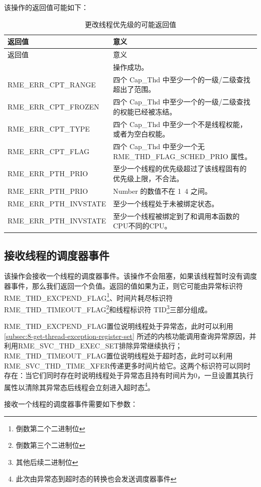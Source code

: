 该操作的返回值可能如下：

\begin{xltabular}{\textwidth}{@{}>{\hsize\raggedright\arraybackslash}X>{\hsize\raggedright\arraybackslash}X@{}}
\caption{更改线程优先级的可能返回值}\label{tab:4-31-change-thread-priority-return-values}\\
\toprule
返回值 & 意义\tabularnewline
\endfirsthead
\toprule
返回值 & 意义\tabularnewline
\midrule
\endhead
\bottomrule
{} & 操作成功。\tabularnewline
    RME\_ERR\_CPT\_RANGE & 四个 Cap\_Thd 中至少一个的一级/二级查找超出了范围。\tabularnewline
    RME\_ERR\_CPT\_FROZEN & 四个 Cap\_Thd 中至少一个的一级/二级查找的权能已经被冻结。\tabularnewline
    RME\_ERR\_CPT\_TYPE & 四个 Cap\_Thd 中至少一个不是线程权能，或者为空白权能。\tabularnewline
    RME\_ERR\_CPT\_FLAG & 四个 Cap\_Thd 中至少一个无 RME\_THD\_FLAG\_SCHED\_PRIO 属性。\tabularnewline
    RME\_ERR\_PTH\_PRIO & 至少一个线程的优先级超过了该线程固有的优先级上限，不合法。\tabularnewline
    RME\_ERR\_PTH\_PRIO & Number 的数值不在 1~4 之间。\tabularnewline
    RME\_ERR\_PTH\_INVSTATE & 至少一个线程处于未被绑定状态。\tabularnewline
    RME\_ERR\_PTH\_INVSTATE & 至少一个线程被绑定到了和调用本函数的CPU不同的CPU。\tabularnewline
\end{xltabular}

\subsection{接收线程的调度器事件}\label{subsec:4-receive-thread-scheduler-event}
\nopagebreak[4]

该操作会接收一个线程的调度器事件。该操作不会阻塞，如果该线程暂时没有调度器事件，那么我们返回一个负值。返回的值如果为正，则它可能由异常标识符 RME\_THD\_EXCPEND\_FLAG\footnote{倒数第二个二进制位}、时间片耗尽标识符 RME\_THD\_TIMEOUT\_FLAG\footnote{倒数第三个二进制位}和线程标识符 TID\footnote{其他后续二进制位}三部分组成。

RME\_THD\_EXCPEND\_FLAG置位说明线程处于异常态，此时可以利用\ref{subsec:8-get-thread-exception-register-set}
所述的内核功能调用查询异常原因，并利用RME\_SVC\_THD\_EXEC\_SET排除异常继续执行；RME\_THD\_TIMEOUT\_FLAG置位说明线程处于超时态，此时可以利用RME\_SVC\_THD\_TIME\_XFER传递更多时间片给它。这两个标识符可以同时存在：当它们同时存在时说明线程处于异常态且持有时间片为0，一旦设置其执行属性以清除其异常态后线程会立刻进入超时态\footnote{此次由异常态到超时态的转换也会发送调度器事件}。

接收一个线程的调度器事件需要如下参数：

